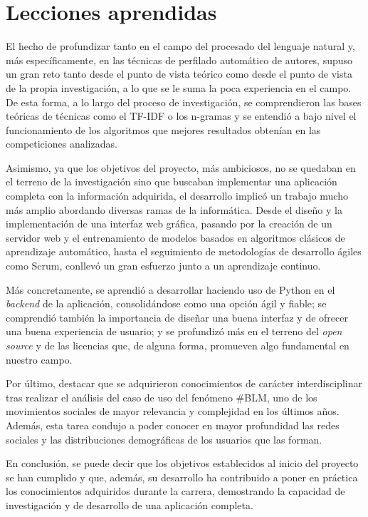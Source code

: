 \section{Lecciones aprendidas}
\label{sec:lecciones_aprendidas}

El hecho de profundizar tanto en el campo del procesado del lenguaje natural y, más específicamente,
en las técnicas de perfilado automático de autores, supuso un gran reto tanto desde el punto de vista teórico como
desde el punto de vista de la propia investigación, a lo que se le suma la poca experiencia en el campo. De esta forma, a lo largo del
proceso de investigación, se comprendieron las bases teóricas de técnicas como el TF-IDF o los n-gramas y se entendió a
bajo nivel el funcionamiento de los algoritmos que mejores resultados obtenían en las competiciones analizadas.

\bigskip
Asimismo, ya que los objetivos del proyecto, más ambiciosos, no se quedaban en el terreno de la investigación
sino que buscaban implementar una aplicación completa con la información adquirida, el desarrollo implicó un trabajo
mucho más amplio abordando diversas ramas de la informática. Desde el diseño y la implementación de una interfaz web gráfica,
pasando por la creación de un servidor web y el entrenamiento de modelos basados en algoritmos clásicos
de aprendizaje automático, hasta el seguimiento de metodologías de desarrollo ágiles como Scrum, conllevó
un gran esfuerzo junto a un aprendizaje continuo.

\bigskip
Más concretamente, se aprendió a desarrollar haciendo uso de Python en el \textit{backend} de la aplicación, consolidándose
como una opción ágil y fiable; se comprendió también la importancia de diseñar una buena interfaz
y de ofrecer una buena experiencia de usuario; y se profundizó más en el terreno del \textit{open source} y de las licencias
que, de alguna forma, promueven algo fundamental en nuestro campo.

\bigskip
Por último, destacar que se adquirieron conocimientos de carácter interdisciplinar tras realizar el análisis del caso de uso del fenómeno \#BLM,
uno de los movimientos sociales de mayor relevancia y complejidad en los últimos años. Además, esta tarea condujo
a poder conocer en mayor profundidad las redes sociales y las distribuciones demográficas
de los usuarios que las forman.

\bigskip
En conclusión, se puede decir que los objetivos establecidos al inicio del proyecto se han cumplido y que,
además, su desarrollo ha contribuido a poner en práctica los conocimientos adquiridos durante la carrera,
demostrando la capacidad de investigación y de desarrollo de una aplicación completa.

